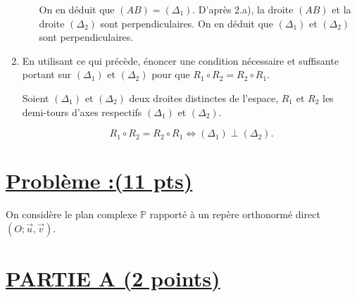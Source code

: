 \documentclass[12pt,a4paper]{article}
\begin{document}
\begin{enumerate}
\begin{enumerate}
			On en déduit que $(AB) = (\Delta_1)$. D’après 2.a), la droite $(AB)$ et la droite $(\Delta_2)$ sont perpendiculaires. On en déduit que $(\Delta_1)$ et $(\Delta_2)$ sont perpendiculaires.
		\end{enumerate}
\item En utilisant ce qui précède, énoncer une condition nécessaire et suffisante portant sur $(\Delta_1)$ et $(\Delta_2)$ pour que $R_1 \circ R_2 = R_2 \circ R_1$.

Soient $(\Delta_1)$ et $(\Delta_2)$ deux droites distinctes de l’espace, $R_1$ et $R_2$ les demi-tours d’axes respectifs $(\Delta_1)$ et $(\Delta_2)$.

\[ R_1 \circ R_2 = R_2 \circ R_1 \iff (\Delta_1) \perp (\Delta_2). \]
\end{enumerate}

\section*{\underline{Problème :(11 pts)}}

On considère le plan complexe $\mathbb{P}$ rapporté à un repère orthonormé direct $(O ; \vec{u}, \vec{v})$.

	\section*{\underline{PARTIE A (2 points)}}
\end{document}
